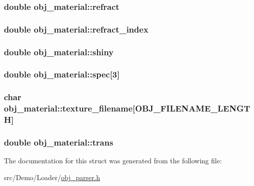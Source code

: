 \hypertarget{structobj__material_a322daa5a65bd76d646dea59bf93e29c0}{
\subsubsection[{refract}]{\setlength{\rightskip}{0pt plus 5cm}double obj\+\_\+material\+::refract}}\label{structobj__material_a322daa5a65bd76d646dea59bf93e29c0}
\hypertarget{structobj__material_a6931b83a6b1e681d094751258189259b}{
\subsubsection[{refract\+\_\+index}]{\setlength{\rightskip}{0pt plus 5cm}double obj\+\_\+material\+::refract\+\_\+index}}\label{structobj__material_a6931b83a6b1e681d094751258189259b}
\hypertarget{structobj__material_aa238fbf38e7eadb10ceed02324213d5d}{
\subsubsection[{shiny}]{\setlength{\rightskip}{0pt plus 5cm}double obj\+\_\+material\+::shiny}}\label{structobj__material_aa238fbf38e7eadb10ceed02324213d5d}
\hypertarget{structobj__material_aaba883a6684bc146f396a39534e5ae57}{
\subsubsection[{spec}]{\setlength{\rightskip}{0pt plus 5cm}double obj\+\_\+material\+::spec\mbox{[}3\mbox{]}}}\label{structobj__material_aaba883a6684bc146f396a39534e5ae57}
\hypertarget{structobj__material_a432c6437ac6a50152c553684fab0aaef}{
\subsubsection[{texture\+\_\+filename}]{\setlength{\rightskip}{0pt plus 5cm}char obj\+\_\+material\+::texture\+\_\+filename\mbox{[}{\bf O\+B\+J\+\_\+\+F\+I\+L\+E\+N\+A\+M\+E\+\_\+\+L\+E\+N\+G\+T\+H}\mbox{]}}}\label{structobj__material_a432c6437ac6a50152c553684fab0aaef}
\hypertarget{structobj__material_adfe718fbbdb972e83b4159d4c634b14b}{
\subsubsection[{trans}]{\setlength{\rightskip}{0pt plus 5cm}double obj\+\_\+material\+::trans}}\label{structobj__material_adfe718fbbdb972e83b4159d4c634b14b}


The documentation for this struct was generated from the following file\+:\begin{DoxyCompactItemize}
\item 
src/\+Demo/\+Loader/\hyperlink{obj__parser_8h}{obj\+\_\+parser.\+h}\end{DoxyCompactItemize}
